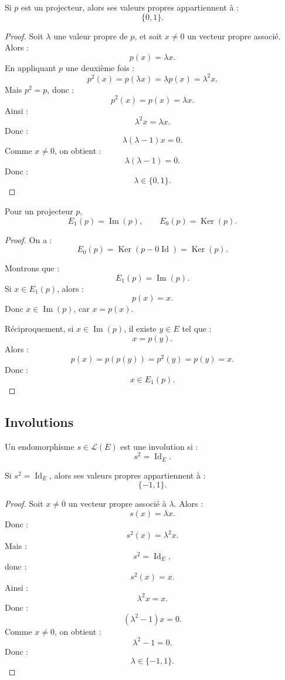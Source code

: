 \documentclass[11pt,a4paper]{article}
\newcommand{\Lcal}{\mathcal L}
\newcommand{\Ker}{\operatorname{Ker}}
\newcommand{\Imf}{\operatorname{Im}}
\newcommand{\Id}{\operatorname{Id}}
\begin{document}
\begin{theorembox}
Si \(p\) est un projecteur, alors ses valeurs propres appartiennent à :
\[
\{0,1\}.
\]
\end{theorembox}

\begin{proof}
Soit \(\lambda\) une valeur propre de \(p\), et soit \(x\neq0\) un vecteur propre associé.  
Alors :
\[
p(x)=\lambda x.
\]
En appliquant \(p\) une deuxième fois :
\[
p^2(x)=p(\lambda x)=\lambda p(x)=\lambda^2x.
\]
Mais \(p^2=p\), donc :
\[
p^2(x)=p(x)=\lambda x.
\]
Ainsi :
\[
\lambda^2x=\lambda x.
\]
Donc :
\[
\lambda(\lambda-1)x=0.
\]
Comme \(x\neq0\), on obtient :
\[
\lambda(\lambda-1)=0.
\]
Donc :
\[
\lambda\in\{0,1\}.
\]
\end{proof}

\begin{theorembox}
Pour un projecteur \(p\),
\[
E_1(p)=\Imf(p),
\qquad
E_0(p)=\Ker(p).
\]
\end{theorembox}

\begin{proof}
On a :
\[
E_0(p)=\Ker(p-0\Id)=\Ker(p).
\]

Montrons que :
\[
E_1(p)=\Imf(p).
\]
Si \(x\in E_1(p)\), alors :
\[
p(x)=x.
\]
Donc \(x\in\Imf(p)\), car \(x=p(x)\).

Réciproquement, si \(x\in\Imf(p)\), il existe \(y\in E\) tel que :
\[
x=p(y).
\]
Alors :
\[
p(x)=p(p(y))=p^2(y)=p(y)=x.
\]
Donc :
\[
x\in E_1(p).
\]
\end{proof}

\subsection{Involutions}

\begin{definitionbox}[Involution]
Un endomorphisme \(s\in\Lcal(E)\) est une involution si :
\[
s^2=\Id_E.
\]
\end{definitionbox}

\begin{theorembox}
Si \(s^2=\Id_E\), alors ses valeurs propres appartiennent à :
\[
\{-1,1\}.
\]
\end{theorembox}

\begin{proof}
Soit \(x\neq0\) un vecteur propre associé à \(\lambda\).  
Alors :
\[
s(x)=\lambda x.
\]
Donc :
\[
s^2(x)=\lambda^2x.
\]
Mais :
\[
s^2=\Id_E,
\]
donc :
\[
s^2(x)=x.
\]
Ainsi :
\[
\lambda^2x=x.
\]
Donc :
\[
(\lambda^2-1)x=0.
\]
Comme \(x\neq0\), on obtient :
\[
\lambda^2-1=0.
\]
Donc :
\[
\lambda\in\{-1,1\}.
\]
\end{proof}
\end{document}
